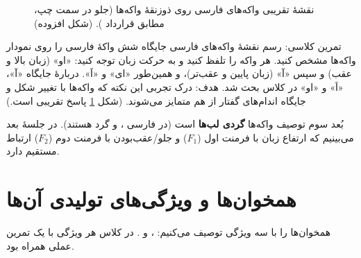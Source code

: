 \begin{figure}[htbp]
\centering
{}
\caption{نقشهٔ تقریبی واکه‌های فارسی روی ذوزنقهٔ واکه‌ها (جلو در سمت چپ، مطابق قرارداد ). (شکل افزوده)}
\label{fig:ch02-vowel-persian}
\end{figure}

\begin{assignmentbox}{تمرین کلاسی: رسم نقشهٔ واکه‌های فارسی}
جایگاه شش واکهٔ فارسی را روی نمودار واکه‌ها مشخص کنید. هر واکه را تلفظ کنید و به حرکت زبان توجه کنید: «او» (زبان بالا و عقب) و سپس «آ» (زبان پایین و عقب‌تر)، و همین‌طور «ای» و «اَ». دربارهٔ جایگاه «آ»، «اَ» و «او» در کلاس بحث شد. هدف: درک تجربی این نکته که واکه‌ها با تغییر شکل و جایگاه اندام‌های گفتار از هم متمایز می‌شوند. (شکل \ref{fig:ch02-vowel-persian} پاسخ تقریبی است.)
\end{assignmentbox}

بُعد سوم توصیف واکه‌ها \textbf{گردی لب‌ها} است (در فارسی ،  و  گرد هستند). در جلسهٔ بعد می‌بینیم که ارتفاع زبان با فرمنت اول ($F_1$) و جلو/عقب‌بودن با فرمنت دوم ($F_2$) ارتباط مستقیم دارد.

\section{همخوان‌ها و ویژگی‌های تولیدی آن‌ها}

همخوان‌ها را با سه ویژگی توصیف می‌کنیم: ،  و . در کلاس هر ویژگی با یک تمرین عملی همراه بود.

